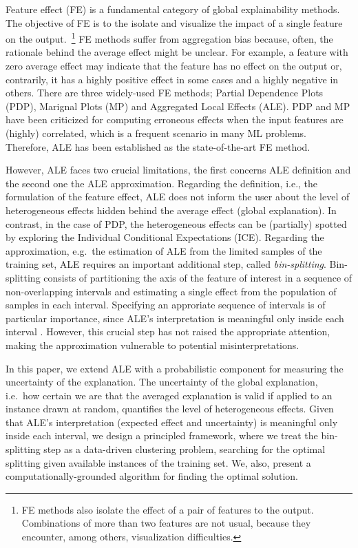 \documentclass[twoside]{article}
\begin{document}
Feature effect (FE) \citep{Gromping2020MAEP} is a fundamental category
of global explainability methods. The objective of FE is to the
isolate and visualize the impact of a single feature on the
output.~\footnote{FE methods also isolate the effect of a pair of
  features to the output. Combinations of more than two features are
  not usual, because they encounter, among others, visualization
  difficulties.} FE methods suffer from aggregation bias because,
often, the rationale behind the average effect might be unclear. For
example, a feature with zero average effect may indicate that the
feature has no effect on the output or, contrarily, it has a highly
positive effect in some cases and a highly negative in others. There
are three widely-used FE methods; Partial Dependence Plots
(PDP)\citep{friedman2001greedy}, Marignal Plots
(MP)\citep{apley2020visualizing} and Aggregated Local Effects
(ALE)\citep{apley2020visualizing}. PDP and MP have been criticized for
computing erroneous effects when the input features are (highly)
correlated, which is a frequent scenario in many ML
problems. Therefore, ALE has been established as the state-of-the-art
FE method.

However, ALE faces two crucial limitations, the first concerns ALE
definition and the second one the ALE approximation. Regarding the
definition, i.e., the formulation of the feature effect, ALE does not
inform the user about the level of heterogeneous effects hidden behind
the average effect (global explanation). In contrast, in the case of
PDP, the heterogeneous effects can be (partially) spotted by exploring
the Individual Conditional Expectations
(ICE)\citep{goldstein2015peeking}. Regarding the approximation,
e.g.~the estimation of ALE from the limited samples of the training
set, ALE requires an important additional step, called
\textit{bin-splitting}. Bin-splitting consists of partitioning the
axis of the feature of interest in a sequence of non-overlapping
intervals and estimating a single effect from the population of
samples in each interval. Specifying an approriate sequence of
intervals is of particular importance, since ALE's interpretation is
meaningful only inside each interval \citep{molnar2022}. However, this
crucial step has not raised the appropriate attention, making the
approximation vulnerable to potential misinterpretations.

In this paper, we extend ALE with a probabilistic component for
measuring the uncertainty of the explanation. The uncertainty of the
global explanation, i.e.~how certain we are that the averaged
explanation is valid if applied to an instance drawn at random,
quantifies the level of heterogeneous effects. Given that ALE's
interpretation (expected effect and uncertainty) is meaningful only
inside each interval, we design a principled framework, where we treat
the bin-splitting step as a data-driven clustering problem, searching
for the optimal splitting given available instances of the training
set. We, also, present a computationally-grounded algorithm for
finding the optimal solution.
\end{document}
